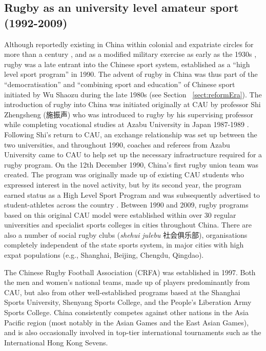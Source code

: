 \begin{CJK}{UTF8}{gbsn}
    \subsection{Rugby as an university level amateur sport (1992-2009)}
Although reportedly existing in China within colonial and expatriate circles for more than a century \citep[210]{Reason1979}, and as a modified military exercise as early as the 1930s \citep[135]{Morris2004}, rugby was a late entrant into the Chinese sport system, established as a ``high level sport program'' in 1990.  The advent of rugby in China was thus part of the ``democratisation'' and ``combining sport and education'' of Chinese sport initiated by Wu Shaozu during the late 1980s (see Section ~\ref{sect:reformEra}).   The introduction of rugby into China was initiated originally at CAU by professor Shi Zhengsheng (施振声) who was introduced to rugby by his
supervising professor while completing vocational studies at Azabu University in Japan 1987-1989 \citep{Xu2010}.  Following Shi’s return to CAU, an exchange relationship was set up between the two universities, and throughout 1990, coaches and referees from Azabu University came to CAU to help set up the necessary infrastructure required for a rugby program.  On the 12th December 1990, China’s first rugby union team was created.  The program was originally made up of existing CAU students who expressed interest in the novel activity, but by its second year, the program earned status as a High Level Sport Program and was subsequently advertised to student-athletes across the country \citep[2]{Xu2010}.  Between 1990 and 2009, rugby programs based on this original CAU model were established within over 30 regular universities and specialist sports colleges in cities throughout China.  There are also a number of social rugby clubs (\textit{shehui julebu} 社会俱乐部), organisations completely independent of the state sports system, in major cities with high expat populations (e.g., Shanghai, Beijing, Chengdu, Qingdao).

The Chinese Rugby Football Association (CRFA) was established in 1997. Both the men and women’s national teams, made up of players predominantly from CAU, but also from other well-established programs based at the Shanghai Sports University, Shenyang Sports College, and the People’s Liberation Army Sports College. China consistently competes against other nations in the Asia Pacific region (most notably in the Asian Games and the East Asian Games), and is also occasionally involved in top-tier international tournaments such as the International Hong Kong Sevens.


\end{CJK}
